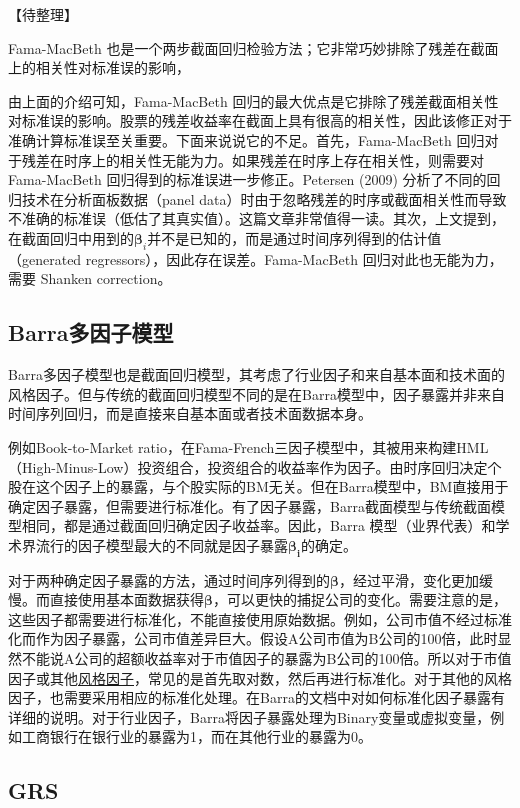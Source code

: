 \documentclass[11pt]{article}
\begin{document}
【待整理】

Fama-MacBeth 也是一个两步截面回归检验方法；它非常巧妙排除了残差在截面上的相关性对标准误的影响，

由上面的介绍可知，Fama-MacBeth 回归的最大优点是它排除了残差截面相关性对标准误的影响。股票的残差收益率在截面上具有很高的相关性，因此该修正对于准确计算标准误至关重要。下面来说说它的不足。首先，Fama-MacBeth 回归对于残差在时序上的相关性无能为力。如果残差在时序上存在相关性，则需要对 Fama-MacBeth 回归得到的标准误进一步修正。Petersen (2009) 分析了不同的回归技术在分析面板数据（panel data）时由于忽略残差的时序或截面相关性而导致不准确的标准误（低估了其真实值）。这篇文章非常值得一读。其次，上文提到，在截面回归中用到的$\bm{\beta}_i$并不是已知的，而是通过时间序列得到的估计值（generated regressors），因此存在误差。Fama-MacBeth 回归对此也无能为力，需要 Shanken correction。

\subsection{Barra多因子模型}

Barra多因子模型也是截面回归模型，其考虑了行业因子和来自基本面和技术面的风格因子。但与传统的截面回归模型不同的是在Barra模型中，因子暴露并非来自时间序列回归，而是直接来自基本面或者技术面数据本身。

例如Book-to-Market ratio，在Fama-French三因子模型中，其被用来构建HML（High-Minus-Low）投资组合，投资组合的收益率作为因子。由时序回归决定个股在这个因子上的暴露，与个股实际的BM无关。但在Barra模型中，BM直接用于确定因子暴露，但需要进行标准化。有了因子暴露，Barra截面模型与传统截面模型相同，都是通过截面回归确定因子收益率。因此，Barra 模型（业界代表）和学术界流行的因子模型最大的不同就是因子暴露$\bm{\beta_i}$的确定。

对于两种确定因子暴露的方法，通过时间序列得到的$\bm{\beta}$，经过平滑，变化更加缓慢。而直接使用基本面数据获得$\bm{\beta}$，可以更快的捕捉公司的变化。需要注意的是，这些因子都需要进行标准化，不能直接使用原始数据。例如，公司市值不经过标准化而作为因子暴露，公司市值差异巨大。假设A公司市值为B公司的100倍，此时显然不能说A公司的超额收益率对于市值因子的暴露为B公司的100倍。所以对于市值因子或其他\uline{风格因子}，常见的是首先取对数，然后再进行标准化。对于其他的风格因子，也需要采用相应的标准化处理。在Barra的文档中对如何标准化因子暴露有详细的说明。对于行业因子，Barra将因子暴露处理为Binary变量或虚拟变量，例如工商银行在银行业的暴露为1，而在其他行业的暴露为0。

\subsection{GRS}
\end{document}
